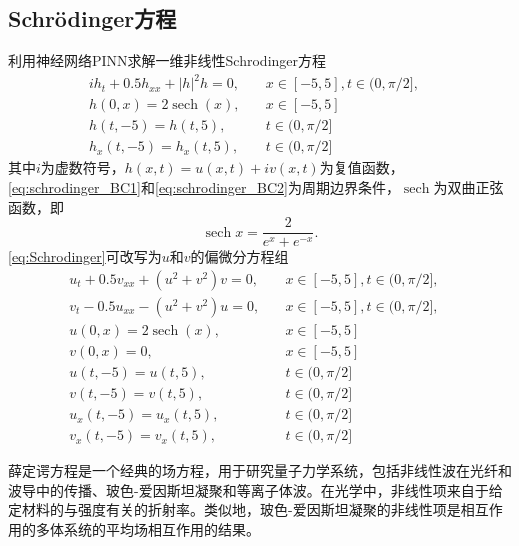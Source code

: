 \documentclass[addpoints,answers]{exam}
\DeclareMathOperator{\sech}{sech}
\begin{document}
  \subsection{Schr\"odinger方程} 利用神经网络PINN求解一维非线性Schrodinger方程  
  \begin{subequations}\label{eq:Schrodinger}
    \begin{align}
      i h_t + 0.5 h_{xx} + |h|^2h = 0, & \quad  x\in[-5,5],   t\in (0,\pi/2], \label{eq:schrodinger_ODE}\\
        h(0,x) = 2 \sech (x), & \quad x \in [-5,5] & \label{eq:schrodinger_IC}\\
        h(t,-5) = h(t, 5), & \quad t\in (0,\pi/2] \label{eq:schrodinger_BC1}\\
          h_x(t,-5) = h_x(t, 5), & \quad t\in (0,\pi/2] \label{eq:schrodinger_BC2}
    \end{align}
  \end{subequations}
  其中$i$为虚数符号，$h(x,t) = u(x,t) + i v(x,t)$为复值函数，\eqref{eq:schrodinger_BC1}和\eqref{eq:schrodinger_BC2}为周期边界条件，$\sech$为双曲正弦函数，即
  $$
  \sech x = \frac{2}{e^x + e^{-x}}.
  $$
  \eqref{eq:Schrodinger}可改写为$u$和$v$的偏微分方程组
  \begin{subequations}\label{eq:Schrodinger_uv}
    \begin{align}
      u_t + 0.5 v_{xx} + (u^2+v^2)v = 0,  & \quad  x\in[-5,5],   t\in (0,\pi/2], \label{eq:schrodinger_ODE_u}\\
        v_t - 0.5 u_{xx} - (u^2+v^2)u = 0, & \quad  x\in[-5,5],   t\in (0,\pi/2], \label{eq:schrodinger_ODE_v}\\
          u(0,x) = 2 \sech (x), & \quad x \in [-5,5] & \label{eq:schrodinger_IC_u}\\
          v(0,x) = 0, & \quad x \in [-5,5] & \label{eq:schrodinger_IC_v}\\
          u(t,-5) = u(t, 5), & \quad t\in (0,\pi/2] \label{eq:schrodinger_BC1_u}\\
            v(t,-5) = v(t, 5), & \quad t\in (0,\pi/2] \label{eq:schrodinger_BC1_v}\\
              u_x(t,-5) = u_x(t, 5), & \quad t\in (0,\pi/2] \label{eq:schrodinger_BC2_u}\\
               v_x(t,-5) = v_x(t, 5), & \quad t\in (0,\pi/2] \label{eq:schrodinger_BC2_v}
    \end{align}
  \end{subequations}

  \begin{remark}
    薛定谔方程是一个经典的场方程，用于研究量子力学系统，包括非线性波在光纤和波导中的传播、玻色-爱因斯坦凝聚和等离子体波。在光学中，非线性项来自于给定材料的与强度有关的折射率。类似地，玻色-爱因斯坦凝聚的非线性项是相互作用的多体系统的平均场相互作用的结果。
  \end{remark}
\end{document}
